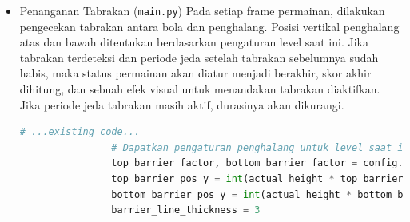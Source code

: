 \documentclass[11pt,a4paper]{article}
\begin{document}
\begin{itemize}
\begin{lstlisting}[language=Python, caption=Logika progres level]
                if center_x_ball + resized_ball_img.shape[1] >= game_view_actual_width:
                    if config.current_level < config.max_level: # Jika belum level maks
                        config.current_score += config.score_this_level # Tambah skor level ini ke total
                        config.score_this_level = 0 # Reset skor untuk level baru
                        config.current_level += 1   # Naik level
                        config.level_up_flash = 60  # Aktifkan efek kilat naik level
                        print(f"Level Up! Current Level: {config.current_level}, Total Score: {config.current_score}")
                    else: # Jika sudah level maks
                        config.current_score += config.score_this_level 
                        config.score_this_level = 0 
                        print(f"Max Level Reached! Final Score: {config.current_score}")
                        # Bisa tambahkan logika menang di sini
                    # Reset posisi bola untuk level baru atau setelah level maks
                    center_x_ball = 0
                    center_y_ball = actual_height // 2 - resized_ball_img.shape[0] // 2
                    config.ball_trail.clear() # Hapus jejak bola
# ...existing code...
\end{lstlisting}
\item Penanganan Tabrakan (\texttt{main.py})
\newline Pada setiap frame permainan, dilakukan pengecekan tabrakan antara bola dan penghalang. Posisi vertikal penghalang atas dan bawah ditentukan berdasarkan pengaturan level saat ini. Jika tabrakan terdeteksi dan periode jeda setelah tabrakan sebelumnya sudah habis, maka status permainan akan diatur menjadi berakhir, skor akhir dihitung, dan sebuah efek visual untuk menandakan tabrakan diaktifkan. Jika periode jeda tabrakan masih aktif, durasinya akan dikurangi.
\begin{lstlisting}[language=Python, caption=Logika penanganan tabrakan]
# ...existing code...
                # Dapatkan pengaturan penghalang untuk level saat ini
                top_barrier_factor, bottom_barrier_factor = config.level_barrier_settings[config.current_level]
                top_barrier_pos_y = int(actual_height * top_barrier_factor)
                bottom_barrier_pos_y = int(actual_height * bottom_barrier_factor)
                barrier_line_thickness = 3
                

\end{lstlisting}
\end{itemize}
\end{document}
